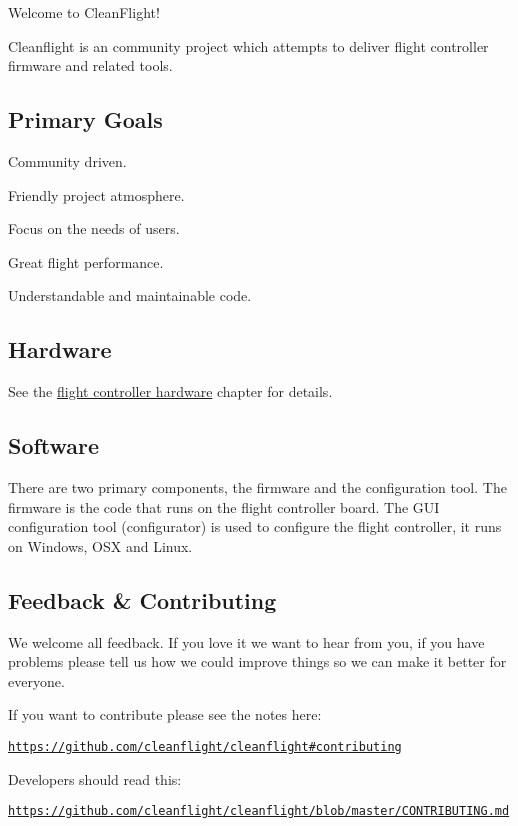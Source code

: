 

Welcome to Clean\+Flight!

Cleanflight is an community project which attempts to deliver flight controller firmware and related tools.

\subsection*{Primary Goals}


\begin{DoxyItemize}
\item Community driven.
\item Friendly project atmosphere.
\item Focus on the needs of users.
\item Great flight performance.
\item Understandable and maintainable code.
\end{DoxyItemize}

\subsection*{Hardware}

See the \hyperlink{Boards_8md}{flight controller hardware} chapter for details.

\subsection*{Software}

There are two primary components, the firmware and the configuration tool. The firmware is the code that runs on the flight controller board. The G\+U\+I configuration tool (configurator) is used to configure the flight controller, it runs on Windows, O\+S\+X and Linux.

\subsection*{Feedback \& Contributing}

We welcome all feedback. If you love it we want to hear from you, if you have problems please tell us how we could improve things so we can make it better for everyone.

If you want to contribute please see the notes here\+:

\href{https://github.com/cleanflight/cleanflight#contributing}{\tt https\+://github.\+com/cleanflight/cleanflight\#contributing}

Developers should read this\+:

\href{https://github.com/cleanflight/cleanflight/blob/master/CONTRIBUTING.md}{\tt https\+://github.\+com/cleanflight/cleanflight/blob/master/\+C\+O\+N\+T\+R\+I\+B\+U\+T\+I\+N\+G.\+md} 
